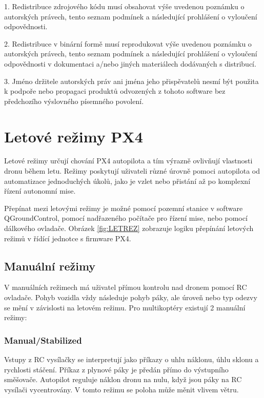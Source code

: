 1. Redistribuce zdrojového kódu musí obsahovat výše uvedenou poznámku o autorských právech, tento seznam podmínek a následující prohlášení o vyloučení odpovědnosti.

2. Redistribuce v binární formě musí reprodukovat výše uvedenou poznámku o autorských právech, tento seznam podmínek a následující prohlášení o vyloučení odpovědnosti v dokumentaci a/nebo jiných materiálech dodávaných s distribucí.

3. Jméno držitele autorských práv ani jména jeho přispěvatelů nesmí být použita k podpoře nebo propagaci produktů odvozených z tohoto software bez předchozího výslovného písemného povolení.

\section{Letové režimy PX4}
\label{sec:letRez}

Letové režimy určují chování PX4 autopilota a tím výrazně ovlivňují vlastnosti dronu během letu. Režimy poskytují uživateli různé úrovně pomoci autopilota od automatizace jednoduchých úkolů, jako je vzlet nebo přistání až po komplexní řízení autonomní mise.

Přepínat mezi letovými režimy je možné pomocí pozemní stanice v software QGroundControl, pomocí nadřazeného počítače pro řízení mise, nebo pomocí dálkového ovladače. Obrázek \ref{fig:LETREZ} zobrazuje logiku přepínání letových režimů v řídící jednotce s firmware PX4. \cite{PX4docs}

\subsection{Manuální režimy}

V manuálních režimech má uživatel přímou kontrolu nad dronem pomocí RC ovladače. Pohyb vozidla vždy následuje pohyb páky, ale úroveň nebo typ odezvy se mění v závislosti na letovém režimu. Pro multikoptéry existují 2 manuální režimy:

\subsubsection{Manual/Stabilized}

Vstupy z RC vysílačky se interpretují jako příkazy o uhlu náklonu, úhlu sklonu a rychlosti stáčení. Příkaz z plynové páky je předán přímo do výstupního směšovače. Autopilot reguluje náklon dronu na nulu, když jsou páky na RC vysílači vycentrovány. V tomto režimu se poloha může měnit vlivem větru.

